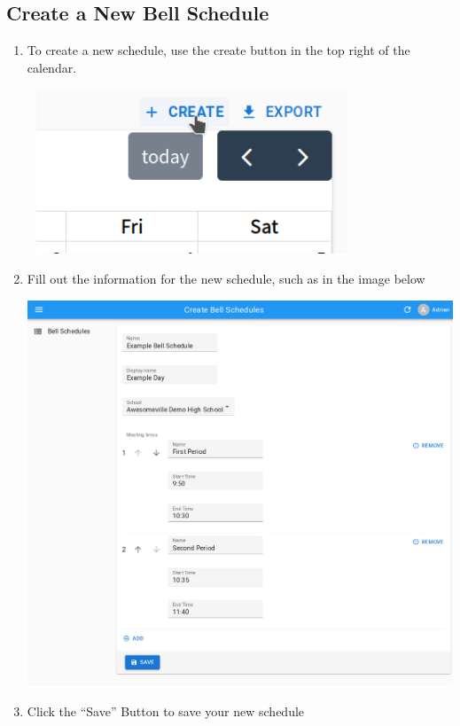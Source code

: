 \documentclass{article}
\begin{document}
\subsection{Create a New Bell Schedule}
\begin{enumerate}
\item {To create a new schedule, use the create button in the top right of the calendar.}
\begin{center}
\includegraphics[width=3.8693in,height=1.9382in]{images/click-create-schedule.png}
\end{center}
\item {Fill out the information for the new schedule, such as in the image below}
\begin{center}
\includegraphics[width=\textwidth]{images/new schedule.png}
\end{center}
\item {Click the “Save” Button to save your new schedule}
\end{enumerate}
\end{document}
